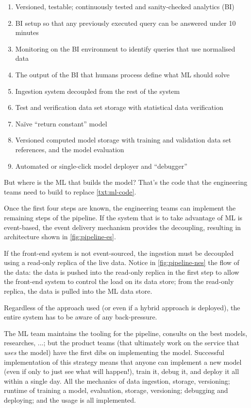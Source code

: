 \begin{enumerate}
  \item Versioned, testable; continuously tested and sanity-checked analytics (BI)
  \item BI setup so that any previously executed query can be answered under 10 minutes
  \item Monitoring on the BI environment to identify queries that use normalised data
  \item The output of the BI that humans process define what ML should solve
  \item Ingestion system decoupled from the rest of the system
  \item Test and verification data set storage with statistical data verification
  \label{txt:ml-code}\item Naïve ``return constant'' model
  \item Versioned computed model storage with training and validation data set references, and the model evaluation
  \item Automated or single-click model deployer and ``debugger''
\end{enumerate}

But where is the ML that builds the model? That's the code that the engineering teams need to build to replace \autoref{txt:ml-code}. 

Once the first four steps are known, the engineering teams can implement the remaining steps of the pipeline. If the system that is to take advantage of ML is event-based, the event delivery mechanism provides the decoupling, resulting in architecture shown in \autoref{fig:pipeline-es}.


If the front-end system is not event-sourced, the ingestion must be decoupled using a read-only replica of the live data. Notice in \autoref{fig:pipeline-nes} the flow of the data: the data is pushed into the read-only replica in the first step to allow the front-end system to control the load on its data store; from the read-only replica, the data is pulled into the ML data store. 


Regardless of the approach used (or even if a hybrid approach is deployed), the entire system has to be aware of any back-pressure.

The ML team maintains the tooling for the pipeline, consults on the best models, researches, ...; but the product teams (that ultimately work on the service that \emph{uses} the model) have the first dibs on implementing the model. Successful implementation of this strategy means that anyone can implement a new model (even if only to just see what will happen!), train it, debug it, and deploy it all within a single day. All the mechanics of data ingestion, storage, versioning; runtime of training a model, evaluation, storage, versioning; debugging and deploying; and the usage is all implemented. 

